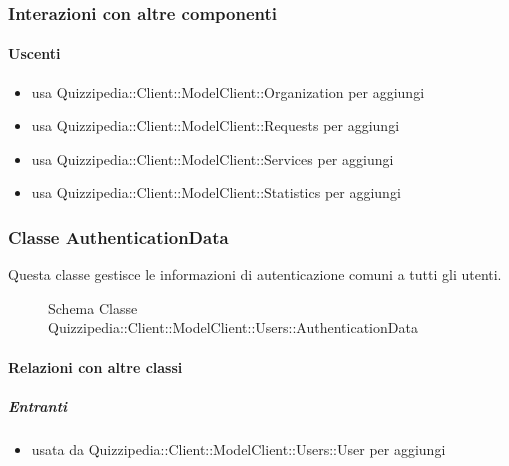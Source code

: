 \subsubsection{Interazioni con altre componenti}
\paragraph{Uscenti}
\begin{itemize}
\item usa Quizzipedia::Client::ModelClient::Organization per aggiungi
\item usa Quizzipedia::Client::ModelClient::Requests per aggiungi
\item usa Quizzipedia::Client::ModelClient::Services per aggiungi
\item usa Quizzipedia::Client::ModelClient::Statistics per aggiungi
\end{itemize}
\subsubsection{Classe AuthenticationData}
Questa classe gestisce le informazioni di autenticazione comuni a tutti gli utenti.
\begin{figure}[H]
\centering
\noindent{}
\caption[Schema Classe AuthenticationData]{Schema Classe Quizzipedia::Client::ModelClient::Users::AuthenticationData}
\end{figure}
\paragraph{Relazioni con altre classi}
\subparagraph{Entranti}
\begin{itemize}
\item usata da Quizzipedia::Client::ModelClient::Users::User per aggiungi
\end{itemize}

